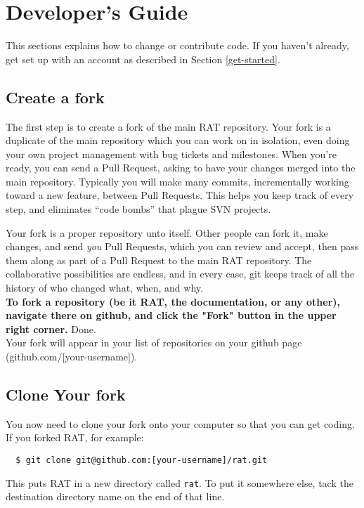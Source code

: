 \documentclass{article}
\begin{document}
\section{Developer's Guide}
This sections explains how to change or contribute code. If you haven't already, get set up with an account as described in Section \ref{get-started}.
\subsection{Create a fork}
\label{create-fork}
The first step is to create a fork of the main RAT repository. Your fork is a duplicate of the main repository which you can work on in isolation, even doing your own project management with bug tickets and milestones. When you're ready, you can send a Pull Request, asking to have your changes merged into the main repository. Typically you will make many commits, incrementally working toward a new feature, between Pull Requests. This helps you keep track of every step, and eliminates ``code bombs'' that plague SVN projects.

Your fork is a proper repository unto itself. Other people can fork it, make changes, and send {\it you} Pull Requests, which you can review and accept, then pass them along as part of a Pull Request to the main RAT repository. The collaborative possibilities are endless, and in every case, git keeps track of all the history of who changed what, when, and why.\\

{\bf To fork a repository (be it RAT, the documentation, or any other), navigate there on github, and click the "Fork" button in the upper right corner.} Done.\\

Your fork will appear in your list of repositories on your github page (github.com/[your-username]).

\subsection{Clone Your fork}
\label{clone-fork}
You now need to clone your fork onto your computer so that you can get coding. If you forked RAT, for example:
\begin{verbatim}
  $ git clone git@github.com:[your-username]/rat.git
\end{verbatim}
This puts RAT in a new directory called {\tt rat}. To put it somewhere else, tack the destination directory name on the end of that line.\\
\end{document}
